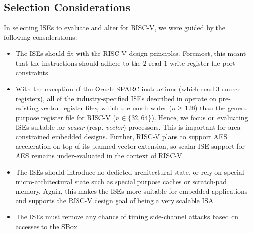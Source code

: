 
\subsection{Selection Considerations}

In selecting ISEs to evaluate and alter for RISC-V, we were guided by the
following considerations:

\begin{itemize}
\item The ISEs should fit with the RISC-V design principles.
      Foremost, this meant that the instructions should adhere to
      the $2$-read-$1$-write register file port constraints.
\item With the exception of the Oracle SPARC
      instructions (which read $3$ source registers),
      all of the industry-specified ISEs described in
       operate on pre-existing vector
      register files, which are much wider ($n\ge128$) than the
      general purpose register file for RISC-V ($n\in\{32,64\}$).
      Hence, we focus on evaluating ISEs suitable for {\em scalar}
      (resp. {\em vector}) processors.
      This is important for area-constrained embedded designs.
      Further, RISC-V plans to support AES acceleration on top of
      its planned vector extension, so scalar ISE support for
      AES remains under-evaluated in the context of RISC-V.
\item The ISEs should introduce no dedicted architectural state, or
      rely on special micro-architectural state such as special
      purpose caches or scratch-pad memory.
      Again, this makes the ISEs more suitable for embedded
      applications and supports the RISC-V design goal of being
      a very scalable ISA.
\item The ISEs must remove any chance of timing side-channel attacks
      based on accesses to the SBox.
\end{itemize}


